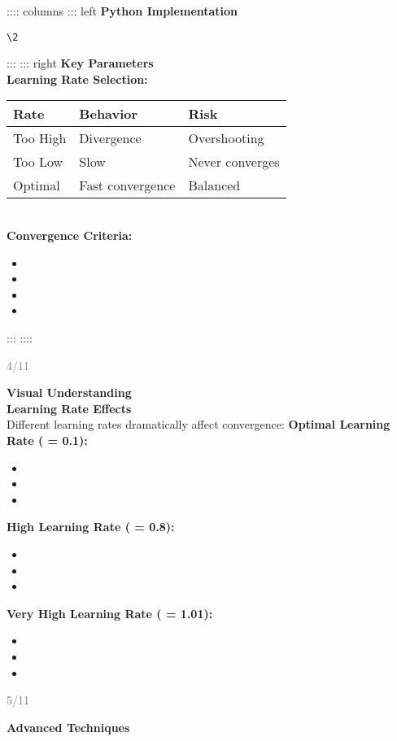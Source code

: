 \documentclass[11pt]{article}
\begin{document}
:::: columns
::: left
\textbf{\Large Python Implementation}\\[0.3cm]
\begin{lstlisting}
\2
\end{lstlisting}
:::
::: right
\textbf{\Large Key Parameters}\\[0.3cm]
\textbf{Learning Rate Selection:}
\begin{center}
\begin{tabular}{lll}
\hline
\textbf{Rate} & \textbf{Behavior} & \textbf{Risk} \\
\hline
Too High & Divergence & Overshooting \\
Too Low & Slow & Never converges \\
Optimal & Fast convergence & Balanced \\
\hline
\end{tabular}
\end{center}\\
\textbf{Convergence Criteria:}
\begin{itemize}
\item \1
\item \1
\item \1
\item \1
\end{itemize}
:::
::::\n\n\vfill\n\begin{flushright}\n\textcolor{gray}{\small 4/11}\n\end{flushright}\n\n\newpage\n\n\textbf{\huge Visual Understanding}\\[0.5cm]
\textbf{\Large Learning Rate Effects}\\[0.3cm]
Different learning rates dramatically affect convergence:
\textbf{Optimal Learning Rate ( = 0.1):}
\begin{itemize}
\item \1
\item \1
\item \1
\end{itemize}
\textbf{High Learning Rate ( = 0.8):}
\begin{itemize}
\item \1
\item \1
\item \1
\end{itemize}
\textbf{Very High Learning Rate ( = 1.01):}
\begin{itemize}
\item \1
\item \1
\item \1
\end{itemize}\n\n\vfill\n\begin{flushright}\n\textcolor{gray}{\small 5/11}\n\end{flushright}\n\n\newpage\n\n\textbf{\huge Advanced Techniques}\\[0.5cm]
\end{document}

